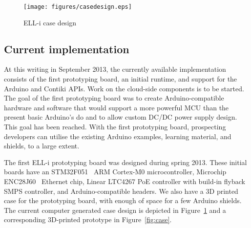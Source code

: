 \documentclass[final]{siamltex}
\begin{document}
\begin{figure}
\centering
\texttt{[image: figures/casedesign.eps]}
\caption{ELL-i case design}
\label{fig:casedesign}
\end{figure}

\subsection{Current implementation}

At this writing in September 2013, the currently available
implementation consists of the first prototyping board, an initial
runtime, and support for the Arduino and Contiki APIs.  Work on the cloud-side
components is to be started.
The goal of the first prototyping board was to create
Arduino-compatible hardware and software that would support a more
powerful
MCU than the present basic Arduino's do and to allow custom DC/DC
power supply design.  This goal has been reached.  With the first
prototyping board, prospecting developers can utilise the existing
Arduino examples, learning material, and shields, to a large extent.

The first ELL-i prototyping board was designed during spring 2013.  These
initial boards have an STM32F051~\cite{STM32F051} ARM Cortex-M0 microcontroller,
Microchip ENC28J60~\cite{ENC28J60} Ethernet chip, Linear LTC4267 PoE controller
with build-in flyback SMPS controller, and Arduino-compatible headers.  We also
have a 3D printed case for the prototyping board, with enough of space for a few
Arduino shields. The current computer generated case design is depicted in
Figure~\ref{fig:casedesign} and a corresponding 3D-printed prototype in
Figure~\ref{fig:case}.


\end{document}
